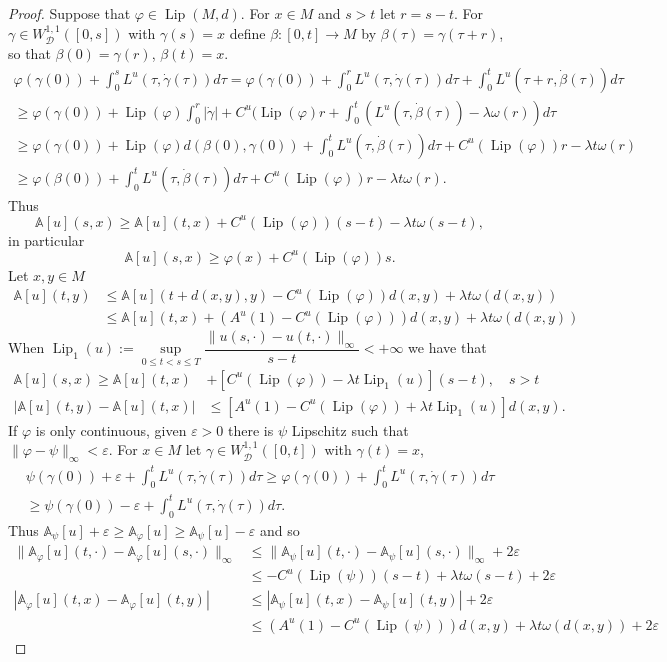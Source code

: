 \documentclass[12pt]{amsart}
\theoremstyle{plain}
\theoremstyle{definition}
\newcommand{\A}{\mathbb A}
\newcommand{\cD}{\mathcal D}
\newcommand{\cW}{W^{1,1}}
\newcommand{\cWD}{\cW_\cD}
\newcommand{\fui}{\varphi}
\newcommand{\ep}{\varepsilon}
\newcommand{\be}{\beta}
\newcommand{\ga}{\gamma}
\newcommand{\om}{\omega}
\newcommand{\la}{\lambda}
\newcommand{\dga}{\dot\gamma}
\newcommand{\Lip}{\operatorname{Lip}}
\begin{document}
\begin{proof}
Suppose that $\fui\in\Lip(M,d)$.
For $x\in M$ and $s>t$ let $r=s-t$. For $\ga\in\cWD([0,s])$ with
$\ga(s)=x$ define $\be:[0,t]\to M$
by $\be(\tau)=\ga(\tau+r)$, so that $\be(0)=\ga(r)$, $\be(t)=x$.
\begin{align*}
  \fui(\ga(0))+\int_0^sL^u(\tau,\dga(\tau)) d\tau
=\fui(\ga(0))+\int_0^rL^u(\tau,\dga(\tau)) d\tau
+\int_0^t L^u(\tau+r,\dot\be(\tau)) d\tau\\
 \ge\fui(\ga(0))+\Lip(\fui)\int_0^{r}|\dga|+C^u(\Lip(\fui)r
 +\int_0^t( L^u(\tau,\dot\be(\tau))-\la\om(r)) d\tau\\
\ge\fui(\ga(0))+\Lip(\fui)d(\be(0),\ga(0))+\int_0^t L^u(\tau,\dot\be(\tau)) d\tau+
C^u(\Lip(\fui))r-\la t\om(r)\\
\ge\fui(\be(0)) +\int_0^t L^u(\tau,\dot\be(\tau)) d\tau+
C^u(\Lip(\fui))r-\la t\om(r). %
\end{align*}
Thus
\[\A[u](s,x)\ge\A[u](t,x)+C^u(\Lip(\fui))(s-t)-\la t\om(s-t),\]
in particular
\begin{equation}
  \label{eq:t,s}
  \A[u](s,x)\ge \fui(x)+C^u(\Lip(\fui))s.
  \end{equation}
Let $x,y\in M$
\begin{align*}
\A[u](t,y)&\le\A[u](t+d(x,y),y)-C^u(\Lip(\fui))d(x,y)+\la t\om(d(x,y))\\  
&\le\A[u](t,x)+(A^u(1)-C^u(\Lip(\fui)))d(x,y) +\la t\om(d(x,y))
\end{align*}
When $\Lip_1(u):=\sup\limits_{0\le t<s\le T}\dfrac{\|u(s,\cdot)-u(t,\cdot)\|_\infty}{s-t}<+\infty$
we have that
\begin{align*}
  \A[u](s,x)\ge\A[u](t,x)&+[C^u(\Lip(\fui))-\la t\Lip_1(u)](s-t),\quad s>t\\
|\A[u](t,y)-\A[u](t,x)|&\le [A^u(1)-C^u(\Lip(\fui))+\la t\Lip_1(u)]d(x,y).
\end{align*}
If $\fui$ is only continuous,
given $\ep>0$ there is $\psi$ Lipschitz such that $\|\fui-\psi\|_\infty<\ep$.
For $x\in M$ let $\ga\in\cWD([0,t])$ with $\ga(t)=x$,
\begin{multline*}
  \psi(\ga(0))+\ep+\int_0^tL^u(\tau, \dga(\tau)) d\tau
\ge \fui(\ga(0))+\int_0^tL^u(\tau, \dga(\tau)) d\tau\\
  \ge\psi(\ga(0))-\ep+\int_0^tL^u(\tau, \dga(\tau)) d\tau.
\end{multline*}
  Thus $\A_\psi[u]+\ep\ge\A_\fui[u]\ge\A_\psi[u]-\ep$ and so
\begin{align*}
  \|\A_\fui[u](t,\cdot)-\A_\fui[u](s,\cdot)\|_\infty
  &\le\|\A_\psi[u](t,\cdot)-\A_\psi[u](s,\cdot)\|_\infty+2\ep\\
&\le -C^u(\Lip(\psi))(s-t)+\la t\om(s-t)+2\ep\\
  |\A_\fui[u](t,x)-\A_\fui[u](t,y)|&\le |\A_\psi[u](t,x)-\A_\psi[u](t,y)|+2\ep\\
&\le(A^u(1)-C^u(\Lip(\psi)))d(x,y) +\la t\om(d(x,y))+2\ep
\end{align*}
\end{proof}
\end{document}
